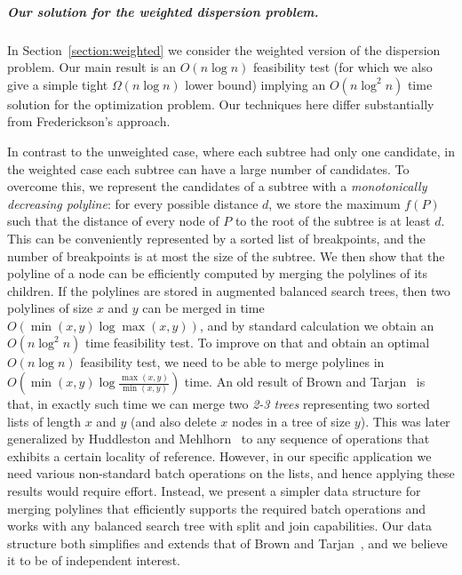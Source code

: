 \documentclass[a4paper,UKenglish]{lipics-v2016}
\theoremstyle{plain}
\newcommand{\Oh}{{O}}
\renewcommand{\paragraph}{\subparagraph}
\begin{document}
\paragraph{Our solution for the weighted dispersion problem.}
In Section~\ref{section:weighted} we consider the weighted version of the dispersion problem. Our main result is an $O(n\log n)$ feasibility test (for which we also give a simple tight $\Omega(n\log n)$ lower bound) implying an $\Oh(n\log^2n)$ time solution for the optimization problem. Our techniques here differ substantially from Frederickson's approach.

In contrast to the unweighted case, where each subtree had only one candidate, in the weighted case each subtree can have a large number of candidates. 
  To overcome this, we represent the candidates of a subtree with a {\em monotonically decreasing polyline}:
for every possible distance $d$, we store the maximum $f(P)$ such that the distance of every node of $P$ to the root of the subtree is at least $d$.
This can be conveniently represented by a sorted list of breakpoints, and the number of breakpoints is at most
the size of the subtree. We then show that the polyline of a node can be efficiently computed by merging the polylines of its children. If the polylines
are stored in augmented balanced search trees, then two polylines of size $x$ and $y$ can be merged in time $\Oh(\min(x,y)\log\max(x,y))$,
and by standard calculation we obtain an $\Oh(n\log^{2}n)$ time feasibility test. To improve on that and obtain an optimal $\Oh(n\log n)$ feasibility test,
we need to be able to merge polylines in $\Oh(\min(x,y)\log\frac{\max(x,y)}{\min(x,y)})$ time. 
An old result of Brown and Tarjan~\cite{Brown1980} is that, in exactly such time we can merge two {\em 2-3 trees} representing two sorted lists of length $x$ and $y$ (and also delete $x$ nodes in a tree of size $y$). This was later generalized by Huddleston and
Mehlhorn~\cite{huddlestonM82} to any sequence of operations that exhibits a certain locality of reference. However, in our specific
application we need various non-standard batch operations on the lists, and hence applying these results would require effort.
Instead, we present a simpler data structure for merging polylines that efficiently supports the required batch operations and works with %
any balanced search tree with split and join capabilities. Our data structure both simplifies and extends that of Brown and Tarjan~\cite{Brown1980}, and we believe it to be of independent interest. 
\end{document}

